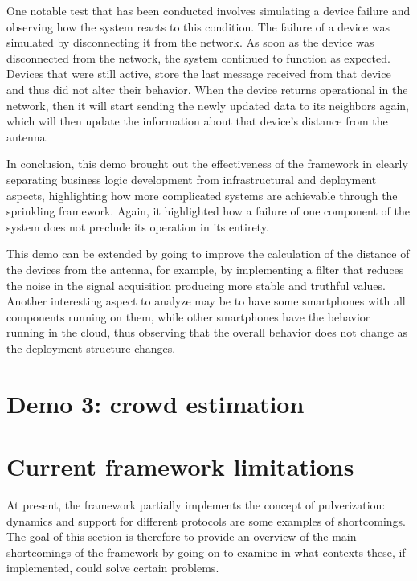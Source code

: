 One notable test that has been conducted involves simulating a device failure and observing how the system reacts to this condition.
The failure of a device was simulated by disconnecting it from the network.
As soon as the device was disconnected from the network, the system continued to function as expected. Devices that were still active, store the last
message received from that device and thus did not alter their behavior. When the device returns operational in the network, then it will start
sending the newly updated data to its neighbors again, which will then update the information about that device's distance from the antenna.

In conclusion, this demo brought out the effectiveness of the framework in clearly separating business logic development from infrastructural and
deployment aspects, highlighting how more complicated systems are achievable through the sprinkling framework. Again, it highlighted how a failure of
one component of the system does not preclude its operation in its entirety.

This demo can be extended by going to improve the calculation of the distance of the devices from the antenna, for example, by implementing a filter
that reduces the noise in the signal acquisition producing more stable and truthful values. Another interesting aspect to analyze may be to have some
smartphones with all components running on them, while other smartphones have the behavior running in the cloud, thus observing that the overall
behavior does not change as the deployment structure changes.

\section{Demo 3: crowd estimation}
\label{sec:demo-3}


\section{Current framework limitations}
\label{sec:framework-limitations}

At present, the framework partially implements the concept of pulverization: dynamics and support for different protocols are some examples of
shortcomings.
The goal of this section is therefore to provide an overview of the main shortcomings of the framework by going on to examine in what contexts these,
if implemented, could solve certain problems.


